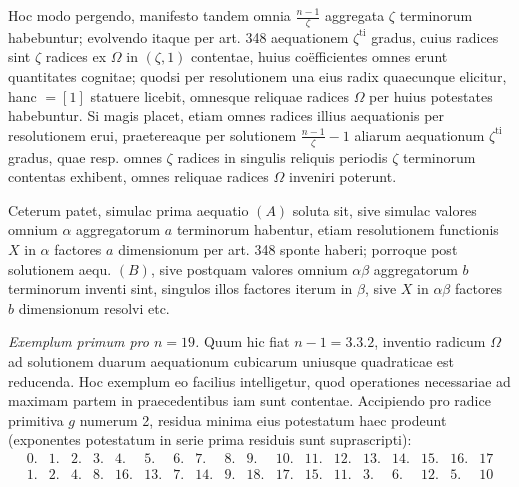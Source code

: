 Hoc modo pergendo, manifesto tandem omnia \(\frac{n-1}{\zeta}\) aggregata \(\zeta\) terminorum habebuntur; evolvendo itaque per art. 348 aequationem \(\zeta^{\mathrm{ti}}\) gradus, cuius radices sint \(\zeta\) radices ex \(\Omega\) in \((\zeta,1)\) contentae, huius coëfficientes omnes erunt quantitates cognitae; quodsi per resolutionem una eius radix quaecunque elicitur, hanc \(=[1]\) statuere licebit, omnesque reliquae radices \(\Omega\) per huius potestates
habebuntur. Si magis placet, etiam omnes radices illius aequationis per resolutionem erui, praetereaque per solutionem \(\frac{n-1}{\zeta}-1\) aliarum aequationum \(\zeta^{\mathrm{ti}}\) gradus, quae resp. omnes \(\zeta\) radices in singulis reliquis periodis \(\zeta\) terminorum contentas exhibent, omnes reliquae radices \(\Omega\) inveniri poterunt.

Ceterum patet, simulac prima aequatio \((A)\) soluta sit, sive simulac valores omnium \(\alpha\) aggregatorum \(a\) terminorum habentur, etiam resolutionem functionis \(X\) in \(\alpha\) factores \(a\) dimensionum per art. 348 sponte haberi; porroque post solutionem aequ. \((B)\), sive postquam valores omnium \(\alpha\beta\) aggregatorum \(b\) terminorum inventi sint, singulos illos factores iterum in \(\beta\), sive \(X\) in \(\alpha\beta\) factores \(b\) dimensionum resolvi etc.

\textit{Exemplum primum pro \(n=19\).} Quum hic fiat \(n-1=3.3.2\), inventio radicum \(\Omega\) ad solutionem duarum aequationum cubicarum uniusque quadraticae est reducenda. Hoc exemplum eo facilius intelligetur, quod operationes necessariae ad maximam partem in praecedentibus iam sunt contentae. Accipiendo pro radice primitiva \(g\) numerum 2, residua minima eius potestatum haec prodeunt (exponentes potestatum in serie prima residuis sunt suprascripti): {\small\setlength{\arraycolsep}{2pt}\[\begin{array}{rrrrrrrrrrrrrrrrrr}0.&1.&2.&3.&4.&5.&6.&7.&8.&9.&10.&11.&12.&13.&14.&15.&16.&17\\1.&2.&4.&8.&16.&13.&7.&14.&9.&18.&17.&15.&11.&3.&6.&12.&5.&10\end{array}\]}

